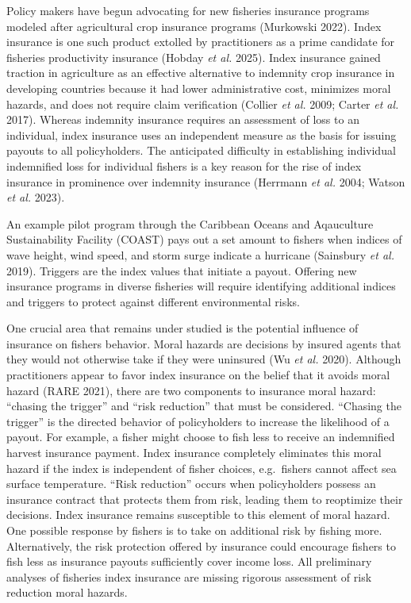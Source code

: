 \documentclass[
  letterpaper,
  DIV=11,
  numbers=noendperiod]{scrartcl}
\theoremstyle{plain}
\theoremstyle{plain}
\theoremstyle{remark}
\begin{document}
Policy makers have begun advocating for new fisheries insurance programs
modeled after agricultural crop insurance programs (Murkowski 2022).
Index insurance is one such product extolled by practitioners as a prime
candidate for fisheries productivity insurance (Hobday \emph{et al.}
2025). Index insurance gained traction in agriculture as an effective
alternative to indemnity crop insurance in developing countries because
it had lower administrative cost, minimizes moral hazards, and does not
require claim verification (Collier \emph{et al.} 2009; Carter \emph{et
al.} 2017). Whereas indemnity insurance requires an assessment of loss
to an individual, index insurance uses an independent measure as the
basis for issuing payouts to all policyholders. The anticipated
difficulty in establishing individual indemnified loss for individual
fishers is a key reason for the rise of index insurance in prominence
over indemnity insurance (Herrmann \emph{et al.} 2004; Watson \emph{et
al.} 2023).

An example pilot program through the Caribbean Oceans and Aqauculture
Sustainability Facility (COAST) pays out a set amount to fishers when
indices of wave height, wind speed, and storm surge indicate a hurricane
(Sainsbury \emph{et al.} 2019). Triggers are the index values that
initiate a payout. Offering new insurance programs in diverse fisheries
will require identifying additional indices and triggers to protect
against different environmental risks.

One crucial area that remains under studied is the potential influence
of insurance on fishers behavior. Moral hazards are decisions by insured
agents that they would not otherwise take if they were uninsured (Wu
\emph{et al.} 2020). Although practitioners appear to favor index
insurance on the belief that it avoids moral hazard (RARE 2021), there
are two components to insurance moral hazard: ``chasing the trigger''
and ``risk reduction'' that must be considered. ``Chasing the trigger''
is the directed behavior of policyholders to increase the likelihood of
a payout. For example, a fisher might choose to fish less to receive an
indemnified harvest insurance payment. Index insurance completely
eliminates this moral hazard if the index is independent of fisher
choices, e.g.~fishers cannot affect sea surface temperature. ``Risk
reduction'' occurs when policyholders possess an insurance contract that
protects them from risk, leading them to reoptimize their decisions.
Index insurance remains susceptible to this element of moral hazard. One
possible response by fishers is to take on additional risk by fishing
more. Alternatively, the risk protection offered by insurance could
encourage fishers to fish less as insurance payouts sufficiently cover
income loss. All preliminary analyses of fisheries index insurance are
missing rigorous assessment of risk reduction moral hazards.
\end{document}
